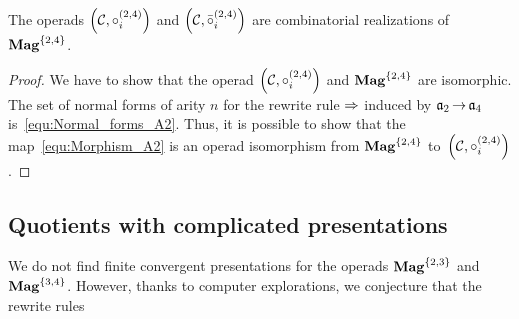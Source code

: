 \begin{Proposition} \label{prop:Realisation_Mag_2_4}
    The operads $\left(\mathcal{C}, \circ_i^{(2,4)}\right)$
    and $\left(\mathcal{C}, \bar{\circ}_i^{(2,4)}\right)$
    are combinatorial realizations of~$\mathbf{Mag}^{\{2, 4\}}$.
\end{Proposition}
\begin{proof}
    We have to show that the operad
    $\left(\mathcal{C}, \circ_i^{(2,4)}\right)$ and $\mathbf{Mag}^{\{2, 4\}}$
    are isomorphic. The set of normal forms of arity $n$ for the
    rewrite rule $\operatorname{\Rightarrow}$ induced by $\mathfrak{a}_2 \operatorname{\to} \mathfrak{a}_4$
    is~\eqref{equ:Normal_forms_A2}. Thus, it is possible to show that
    the map~\eqref{equ:Morphism_A2} is an operad isomorphism from
    $\mathbf{Mag}^{\{2, 4\}}$ to~$\left(\mathcal{C}, \circ_i^{(2,4)}\right)$.
\end{proof}
\medbreak

\subsection{Quotients with complicated presentations}
We do not find finite convergent presentations for the operads
$\mathbf{Mag}^{\{2, 3\}}$ and $\mathbf{Mag}^{\{3, 4\}}$. However, thanks to computer
explorations, we conjecture that the rewrite rules

